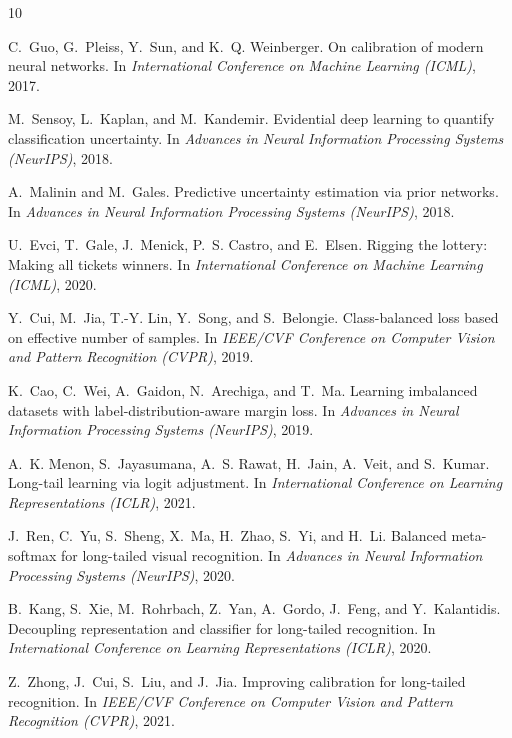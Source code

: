 \documentclass[letterpaper]{article} %
\begin{document}
\begin{thebibliography}{10}\itemsep=-1pt

C.~Guo, G.~Pleiss, Y.~Sun, and K.~Q. Weinberger.
\newblock On calibration of modern neural networks.
\newblock In {\em International Conference on Machine Learning (ICML)}, 2017.

M.~Sensoy, L.~Kaplan, and M.~Kandemir.
\newblock Evidential deep learning to quantify classification uncertainty.
\newblock In {\em Advances in Neural Information Processing Systems (NeurIPS)}, 2018.

A.~Malinin and M.~Gales.
\newblock Predictive uncertainty estimation via prior networks.
\newblock In {\em Advances in Neural Information Processing Systems (NeurIPS)}, 2018.

U.~Evci, T.~Gale, J.~Menick, P.~S. Castro, and E.~Elsen.
\newblock Rigging the lottery: Making all tickets winners.
\newblock In {\em International Conference on Machine Learning (ICML)}, 2020.

Y.~Cui, M.~Jia, T.-Y. Lin, Y.~Song, and S.~Belongie.
\newblock Class-balanced loss based on effective number of samples.
\newblock In {\em IEEE/CVF Conference on Computer Vision and Pattern Recognition (CVPR)}, 2019.

K.~Cao, C.~Wei, A.~Gaidon, N.~Arechiga, and T.~Ma.
\newblock Learning imbalanced datasets with label-distribution-aware margin loss.
\newblock In {\em Advances in Neural Information Processing Systems (NeurIPS)}, 2019.

A.~K. Menon, S.~Jayasumana, A.~S. Rawat, H.~Jain, A.~Veit, and S.~Kumar.
\newblock Long-tail learning via logit adjustment.
\newblock In {\em International Conference on Learning Representations (ICLR)}, 2021.

J.~Ren, C.~Yu, S.~Sheng, X.~Ma, H.~Zhao, S.~Yi, and H.~Li.
\newblock Balanced meta-softmax for long-tailed visual recognition.
\newblock In {\em Advances in Neural Information Processing Systems (NeurIPS)}, 2020.

B.~Kang, S.~Xie, M.~Rohrbach, Z.~Yan, A.~Gordo, J.~Feng, and Y.~Kalantidis.
\newblock Decoupling representation and classifier for long-tailed recognition.
\newblock In {\em International Conference on Learning Representations (ICLR)}, 2020.

Z.~Zhong, J.~Cui, S.~Liu, and J.~Jia.
\newblock Improving calibration for long-tailed recognition.
\newblock In {\em IEEE/CVF Conference on Computer Vision and Pattern Recognition (CVPR)}, 2021.


\end{thebibliography}
\end{document}
